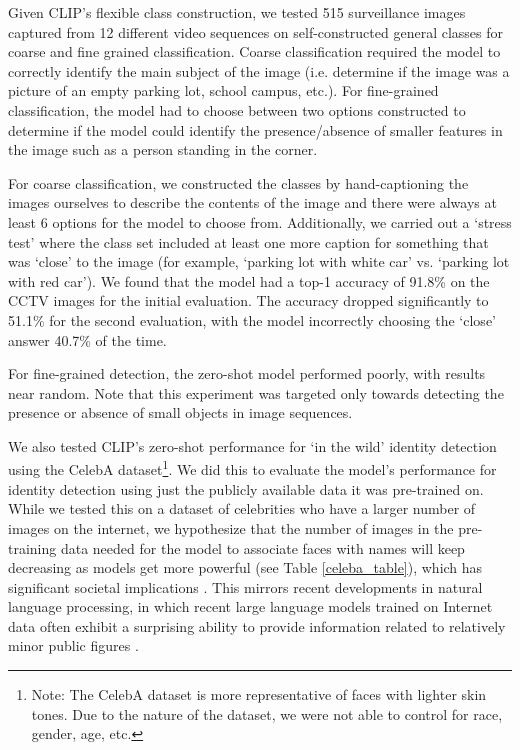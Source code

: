 Given CLIP's flexible class construction, we tested 515 surveillance images captured from 12 different video sequences on self-constructed general classes for coarse and fine grained classification. Coarse classification required the model to correctly identify the main subject of the image (i.e. determine if the image was a picture of an empty parking lot, school campus, etc.). For fine-grained classification, the model had to choose between two options constructed to determine if the model could identify the presence/absence of smaller features in the image such as a person standing in the corner.

For coarse classification, we constructed the classes by hand-captioning the images ourselves to describe the contents of the image and there were always at least 6 options for the model to choose from. Additionally, we carried out a `stress test' where the class set included at least one more caption for something that was `close' to the image (for example, `parking lot with white car' vs. `parking lot with red car'). We found that the model had a top-1 accuracy of 91.8\% on the CCTV images for the initial evaluation. The accuracy dropped significantly to 51.1\% for the second evaluation, with the model incorrectly choosing the `close' answer 40.7\% of the time.

For fine-grained detection, the zero-shot model performed poorly, with results near random. Note that this experiment was targeted only towards detecting the presence or absence of small objects in image sequences.

We also tested CLIP's zero-shot performance for `in the wild' identity detection using the CelebA dataset\footnote{Note: The CelebA dataset is more representative of faces with lighter skin tones. Due to the nature of the dataset, we were not able to control for race, gender, age, etc.}. We did this to evaluate the model's performance for identity detection using just the publicly available data it was pre-trained on. While we tested this on a dataset of celebrities who have a larger number of images on the internet, we hypothesize that the number of images in the pre-training data needed for the model to associate faces with names will keep decreasing as models get more powerful (see Table \ref{celeba_table}), which has significant societal implications \citep{garvie2019}. This mirrors recent developments in natural language processing, in which recent large language models trained on Internet data often exhibit a surprising ability to provide information related to relatively minor public figures \citep{brown2020language}.

